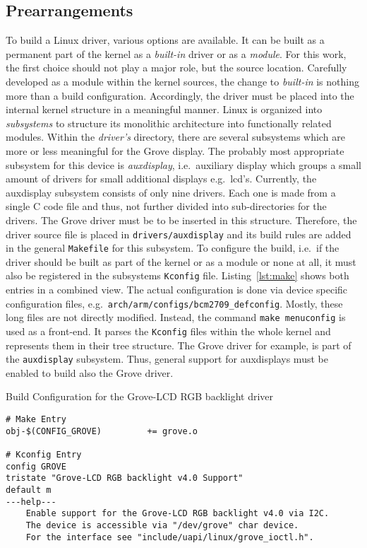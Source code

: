   \subsection{Prearrangements}\label{sec:linux:prearrangements}
To build a Linux driver, various options are available.
It can be built as a permanent part of the kernel as a \textit{built-in} driver or as a \textit{module}.
For this work, the first choice should not play a major role, but the source location.
Carefully developed as a module within the kernel sources, the change to \textit{built-in} is nothing more than a build configuration.
Accordingly, the driver must be placed into the internal kernel structure in a meaningful manner.
Linux is organized into \textit{subsystems} to structure its monolithic architecture into functionally related modules.
Within the \textit{driver's} directory, there are several subsystems which are more or less meaningful for the Grove display.
The probably most appropriate subsystem for this device is \textit{auxdisplay}, i.e.\ auxiliary display which groups a small amount of drivers for small additional displays e.g.\ \ac{lcd}'s.
Currently, the auxdisplay subsystem consists of only nine drivers.
Each one is made from a single C code file and thus, not further divided into sub-directories for the drivers.
The Grove driver must be to be inserted in this structure.
Therefore, the driver source file is placed in \texttt{drivers/auxdisplay} and its build rules are added in the general \texttt{Makefile} for this subsystem.
To configure the build, i.e.\ if the driver should be built as part of the kernel or as a module or none at all, it must also be registered in the subsystems \texttt{Kconfig} file.
Listing~\ref{lst:make} shows both entries in a combined view.
The actual configuration is done via device specific configuration files, e.g.\ \texttt{arch/arm/configs/bcm2709_defconfig}.
Mostly, these long files are not directly modified.
Instead, the command \texttt{make menuconfig} is used as a front-end.
It parses the \texttt{Kconfig} files within the whole kernel and represents them in their tree structure.
The Grove driver for example, is part of the \texttt{auxdisplay} subsystem.
Thus, general support for auxdisplays must be enabled to build also the Grove driver.
%
\begin{listing} [ht]
\caption{Build Configuration for the Grove-LCD RGB backlight driver}
\label{lst:make}
\begin{verbatim}
# Make Entry
obj-$(CONFIG_GROVE)			+= grove.o

# Kconfig Entry
config GROVE
tristate "Grove-LCD RGB backlight v4.0 Support"
default m
---help---
    Enable support for the Grove-LCD RGB backlight v4.0 via I2C.
    The device is accessible via "/dev/grove" char device.
    For the interface see "include/uapi/linux/grove_ioctl.h".
\end{verbatim}
\end{listing}
